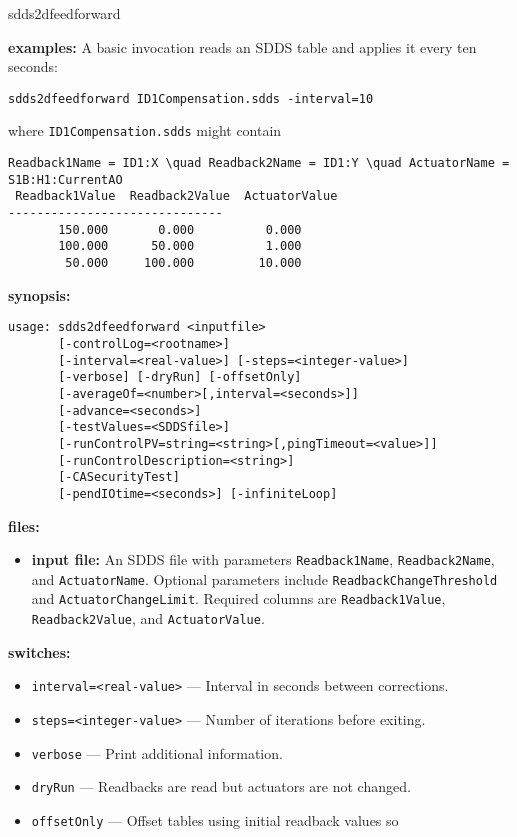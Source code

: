 \begin{sddsprog}{sdds2dfeedforward}
\item \textbf{examples:}
A basic invocation reads an SDDS table and applies it every ten seconds:
\begin{verbatim}
sdds2dfeedforward ID1Compensation.sdds -interval=10
\end{verbatim}
where \verb+ID1Compensation.sdds+ might contain
\begin{verbatim}
Readback1Name = ID1:X \quad Readback2Name = ID1:Y \quad ActuatorName = S1B:H1:CurrentAO
 Readback1Value  Readback2Value  ActuatorValue
------------------------------
       150.000       0.000          0.000
       100.000      50.000          1.000
        50.000     100.000         10.000
\end{verbatim}
\item \textbf{synopsis:}
\begin{verbatim}
usage: sdds2dfeedforward <inputfile>
       [-controlLog=<rootname>]
       [-interval=<real-value>] [-steps=<integer-value>]
       [-verbose] [-dryRun] [-offsetOnly]
       [-averageOf=<number>[,interval=<seconds>]]
       [-advance=<seconds>]
       [-testValues=<SDDSfile>]
       [-runControlPV=string=<string>[,pingTimeout=<value>]]
       [-runControlDescription=<string>]
       [-CASecurityTest]
       [-pendIOtime=<seconds>] [-infiniteLoop]
\end{verbatim}
\item \textbf{files:}
\begin{itemize}
  \item \textbf{input file:} An SDDS file with parameters \verb+Readback1Name+,
  \verb+Readback2Name+, and \verb+ActuatorName+.  Optional parameters include
  \verb+ReadbackChangeThreshold+ and \verb+ActuatorChangeLimit+.  Required
  columns are \verb+Readback1Value+, \verb+Readback2Value+, and
  \verb+ActuatorValue+.
\end{itemize}
\item \textbf{switches:}
\begin{itemize}
  \item {\tt interval=<real-value>} --- Interval in seconds between corrections.
  \item {\tt steps=<integer-value>} --- Number of iterations before exiting.
  \item {\tt verbose} --- Print additional information.
  \item {\tt dryRun} --- Readbacks are read but actuators are not changed.
  \item {\tt offsetOnly} --- Offset tables using initial readback values so

\end{itemize}
\end{sddsprog}
